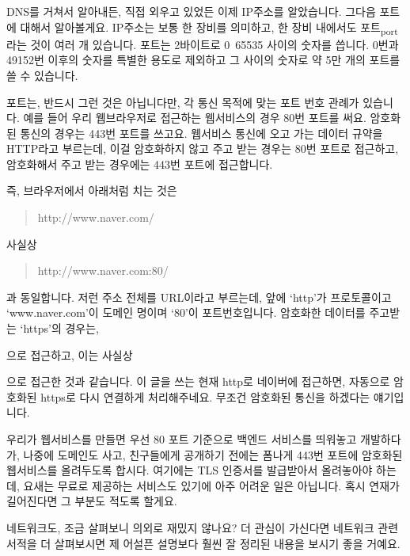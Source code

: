 \documentclass[11pt,a4paper]{article}
\begin{document}
DNS를 거쳐서 알아내든, 직접 외우고 있었든 이제 IP주소를 알았습니다. 그다음 포트에 대해서 알아볼게요. IP주소는 보통 한 장비를 의미하고, 한 장비 내에서도 포트\textsubscript{port}라는 것이 여러 개 있습니다. 포트는 2바이트로 0~65535 사이의 숫자를 씁니다.  0번과 49152번 이후의 숫자를 특별한 용도로 제외하고 그 사이의 숫자로 약 5만 개의 포트를 쓸 수 있습니다.

포트는, 반드시 그런 것은 아닙니다만, 각 통신 목적에 맞는 포트 번호 관례가 있습니다. 예를 들어 우리 웹브라우저로 접근하는 웹서비스의 경우 80번 포트를 써요. 암호화된 통신의 경우는 443번 포트를 쓰고요. 웹서비스 통신에 오고 가는 데이터 규약을 HTTP라고 부르는데, 이걸 암호화하지 않고 주고 받는 경우는 80번 포트로 접근하고, 암호화해서 주고 받는 경우에는 443번 포트에 접근합니다.

즉, 브라우저에서 아래처럼 치는 것은

\begin{quote}
http://www.naver.com/
\end{quote}

사실상

\begin{quote}
http://www.naver.com:80/
\end{quote}

과 동일합니다. 저런 주소 전체를 URL이라고 부르는데, 앞에 `http'가 프로토콜이고 `www.naver.com'이 도메인 명이며 `80'이 포트번호입니다. 암호화한 데이터를 주고받는 `https'의 경우는,

\begin{quote}
\end{quote}

으로 접근하고, 이는 사실상

\begin{quote}
\end{quote}

으로 접근한 것과 같습니다. 이 글을 쓰는 현재 http로 네이버에 접근하면, 자동으로 암호화된 https로 다시 연결하게 처리해주네요. 무조건 암호화된 통신을 하겠다는 얘기입니다.

우리가 웹서비스를 만들면 우선 80 포트 기준으로 백엔드 서비스를 띄워놓고 개발하다가, 나중에 도메인도 사고, 친구들에게 공개하기 전에는 폼나게 443번 포트에 암호화된 웹서비스를 올려두도록 합시다. 여기에는 TLS 인증서를 발급받아서 올려놓아야 하는데, 요새는 무료로 제공하는 서비스도 있기에 아주 어려운 일은 아닙니다. 혹시 연재가 길어진다면 그 부분도 적도록 할게요.

네트워크도, 조금 살펴보니 의외로 재밌지 않나요? 더 관심이 가신다면 네트워크 관련 서적을 더 살펴보시면 제 어설픈 설명보다 훨씬 잘 정리된 내용을 보시기 좋을 거예요.
\end{document}
